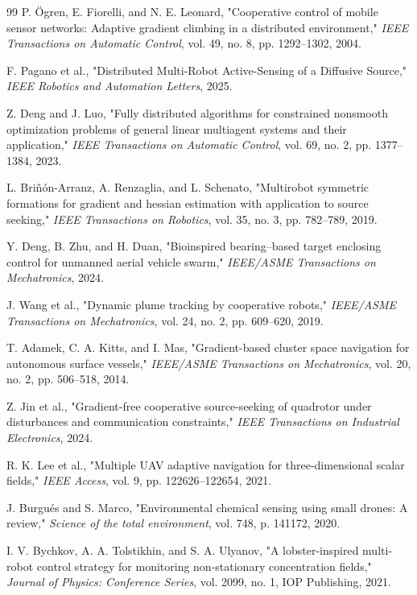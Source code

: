 \documentclass[lettersize,journal]{IEEEtran}
\begin{document}
\begin{thebibliography}{99}
 P. Ögren, E. Fiorelli, and N. E. Leonard, "Cooperative control of mobile sensor networks: Adaptive gradient climbing in a distributed environment," \textit{IEEE Transactions on Automatic Control}, vol. 49, no. 8, pp. 1292--1302, 2004.

 F. Pagano et al., "Distributed Multi-Robot Active-Sensing of a Diffusive Source," \textit{IEEE Robotics and Automation Letters}, 2025.

 Z. Deng and J. Luo, "Fully distributed algorithms for constrained nonsmooth optimization problems of general linear multiagent systems and their application," \textit{IEEE Transactions on Automatic Control}, vol. 69, no. 2, pp. 1377--1384, 2023.

 L. Briñón-Arranz, A. Renzaglia, and L. Schenato, "Multirobot symmetric formations for gradient and hessian estimation with application to source seeking," \textit{IEEE Transactions on Robotics}, vol. 35, no. 3, pp. 782--789, 2019.

 Y. Deng, B. Zhu, and H. Duan, "Bioinspired bearing–based target enclosing control for unmanned aerial vehicle swarm," \textit{IEEE/ASME Transactions on Mechatronics}, 2024.

 J. Wang et al., "Dynamic plume tracking by cooperative robots," \textit{IEEE/ASME Transactions on Mechatronics}, vol. 24, no. 2, pp. 609--620, 2019.

 T. Adamek, C. A. Kitts, and I. Mas, "Gradient-based cluster space navigation for autonomous surface vessels," \textit{IEEE/ASME Transactions on Mechatronics}, vol. 20, no. 2, pp. 506--518, 2014.

 Z. Jin et al., "Gradient-free cooperative source-seeking of quadrotor under disturbances and communication constraints," \textit{IEEE Transactions on Industrial Electronics}, 2024.

 R. K. Lee et al., "Multiple UAV adaptive navigation for three-dimensional scalar fields," \textit{IEEE Access}, vol. 9, pp. 122626--122654, 2021.

 J. Burgués and S. Marco, "Environmental chemical sensing using small drones: A review," \textit{Science of the total environment}, vol. 748, p. 141172, 2020.

 I. V. Bychkov, A. A. Tolstikhin, and S. A. Ulyanov, "A lobster-inspired multi-robot control strategy for monitoring non-stationary concentration fields," \textit{Journal of Physics: Conference Series}, vol. 2099, no. 1, IOP Publishing, 2021.


\end{thebibliography}
\end{document}
